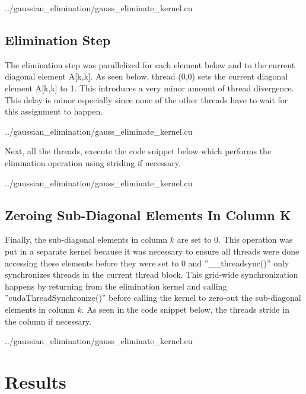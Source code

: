 \documentclass[12pt]{article}
\begin{document}
\vspace{0.25cm}

{../gaussian_elimination/gauss_eliminate_kernel.cu }

\pagebreak
\subsection{Elimination Step}

The elimination step was parallelized for each element below
and to the current diagonal element A[k,k].
As seen below, thread (0,0) sets the current diagonal element 
A[k,k] to 1. This introduces a very minor amount of thread divergence.
This delay is minor especially since none of the other threads 
have to wait for this assignment to happen.

\vspace{0.25cm}

{../gaussian_elimination/gauss_eliminate_kernel.cu }

Next, all the threads, execute the code snippet below
which performs the elimination operation using striding if necessary.

\vspace{0.25cm}

{../gaussian_elimination/gauss_eliminate_kernel.cu }

\pagebreak
\subsection{Zeroing Sub-Diagonal Elements In Column K}

Finally, the sub-diagonal elements in column $k$ are set to $0$.
This operation was put in a separate kernel because it was necessary
to ensure all threads were done accessing these elements before they
were set to $0$ and ''\_\_threadsync()'' only synchronizes threads in
the current thread block. This grid-wide synchronization happens
by returning from the elimination kernel and calling 
''cudaThreadSynchronize()'' before calling the kernel to zero-out
the sub-diagonal elements in column $k$. As seen in the code 
snippet below, the threads stride in the column if necessary.

\vspace{0.25cm}

{../gaussian_elimination/gauss_eliminate_kernel.cu }


\pagebreak
\section{Results}
\vspace{-0.25cm}
\end{document}
